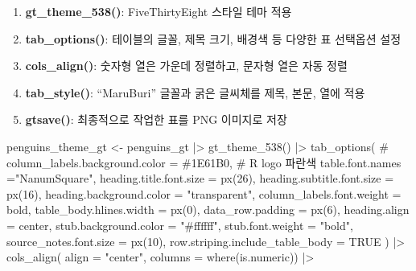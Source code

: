 \documentclass[
  letterpaper,
]{book}
\newenvironment{Shaded}{\begin{snugshade}}{\end{snugshade}}
\newcommand{\AttributeTok}[1]{\textcolor[rgb]{0.40,0.45,0.13}{#1}}
\newcommand{\CommentTok}[1]{\textcolor[rgb]{0.37,0.37,0.37}{#1}}
\newcommand{\ConstantTok}[1]{\textcolor[rgb]{0.56,0.35,0.01}{#1}}
\newcommand{\DecValTok}[1]{\textcolor[rgb]{0.68,0.00,0.00}{#1}}
\newcommand{\FunctionTok}[1]{\textcolor[rgb]{0.28,0.35,0.67}{#1}}
\newcommand{\NormalTok}[1]{\textcolor[rgb]{0.00,0.23,0.31}{#1}}
\newcommand{\OtherTok}[1]{\textcolor[rgb]{0.00,0.23,0.31}{#1}}
\newcommand{\SpecialCharTok}[1]{\textcolor[rgb]{0.37,0.37,0.37}{#1}}
\newcommand{\StringTok}[1]{\textcolor[rgb]{0.13,0.47,0.30}{#1}}
\begin{document}
\begin{enumerate}
\def\labelenumi{\arabic{enumi}.}
\item
  \textbf{gt\_theme\_538()}: FiveThirtyEight 스타일 테마 적용
\item
  \textbf{tab\_options()}: 테이블의 글꼴, 제목 크기, 배경색 등 다양한 표
  선택옵션 설정
\item
  \textbf{cols\_align()}: 숫자형 열은 가운데 정렬하고, 문자형 열은 자동
  정렬
\item
  \textbf{tab\_style()}: ``MaruBuri'' 글꼴과 굵은 글씨체를 제목, 본문,
  열에 적용
\item
  \textbf{gtsave()}: 최종적으로 작업한 표를 PNG 이미지로 저장
\end{enumerate}

\begin{Shaded}
\begin{Highlighting}[]
\NormalTok{penguins\_theme\_gt }\OtherTok{\textless{}{-}}\NormalTok{ penguins\_gt }\SpecialCharTok{|\textgreater{}} 
  \FunctionTok{gt\_theme\_538}\NormalTok{() }\SpecialCharTok{|\textgreater{}} 
  \FunctionTok{tab\_options}\NormalTok{(}
    \CommentTok{\# column\_labels.background.color = \textquotesingle{}\#1E61B0\textquotesingle{}, \# R logo 파란색}
    \AttributeTok{table.font.names =}\StringTok{"NanumSquare"}\NormalTok{,    }
    \AttributeTok{heading.title.font.size =} \FunctionTok{px}\NormalTok{(}\DecValTok{26}\NormalTok{),}
    \AttributeTok{heading.subtitle.font.size =} \FunctionTok{px}\NormalTok{(}\DecValTok{16}\NormalTok{),    }
    \AttributeTok{heading.background.color =} \StringTok{"transparent"}\NormalTok{, }
    \AttributeTok{column\_labels.font.weight =} \StringTok{\textquotesingle{}bold\textquotesingle{}}\NormalTok{,}
    \AttributeTok{table\_body.hlines.width =} \FunctionTok{px}\NormalTok{(}\DecValTok{0}\NormalTok{),}
    \AttributeTok{data\_row.padding =} \FunctionTok{px}\NormalTok{(}\DecValTok{6}\NormalTok{),}
    \AttributeTok{heading.align =} \StringTok{\textquotesingle{}center\textquotesingle{}}\NormalTok{,}
    \AttributeTok{stub.background.color =} \StringTok{"\#ffffff"}\NormalTok{,}
    \AttributeTok{stub.font.weight =} \StringTok{"bold"}\NormalTok{,}
    \AttributeTok{source\_notes.font.size =} \FunctionTok{px}\NormalTok{(}\DecValTok{10}\NormalTok{),}
    \AttributeTok{row.striping.include\_table\_body =} \ConstantTok{TRUE}
\NormalTok{  ) }\SpecialCharTok{|\textgreater{}} 
  \FunctionTok{cols\_align}\NormalTok{( }\AttributeTok{align =} \StringTok{"center"}\NormalTok{, }\AttributeTok{columns =} \FunctionTok{where}\NormalTok{(is.numeric)) }\SpecialCharTok{|\textgreater{}} 

\end{Highlighting}
\end{Shaded}
\end{document}
